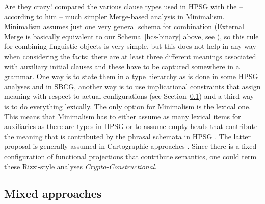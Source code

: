 \documentclass[output=paper]{langsci/langscibook}
\begin{document}
\ex Are they crazy!
\zl
\citet{Chomsky2010a} compared the various clause types used in HPSG with the -- according to him --
much simpler Merge-based analysis in Minimalism. Minimalism assumes just one very general schema for
combination (External Merge is basically equivalent to our Schema~\ref{hcs-binary} above, see
), so this rule for combining linguistic objects is very simple, but this
does not help in any way when considering the facts: there are at least three different meanings
associated with auxiliary initial clauses and these have to be captured somewhere in a grammar. One
way is to state them in a type hierarchy as is done in some HPSG analyses and in SBCG, another way
is to use implicational constraints that assign meaning with respect to actual configurations
(see Section~\ref{sec-mixed-approaches}) and a third way is to do everything lexically. The only option for
Minimalism is the lexical one. This means that Minimalism has to either assume as many lexical items
for auxiliaries as there are types in HPSG or to assume empty heads that contribute the meaning that
is contributed by the phrasal schemata in HPSG \parencites[Section~5]{Borsley2006a}{BM2018Minimalism}. The latter proposal is generally assumed in
Cartographic approaches \citep{Rizzi97a-u}. Since there is a fixed configuration of functional projections
that contribute semantics, one could term these Rizzi-style analyses \emph{Crypto-Constructional}.

\subsection{Mixed approaches}
\label{sec-mixed-approaches}
\end{document}
